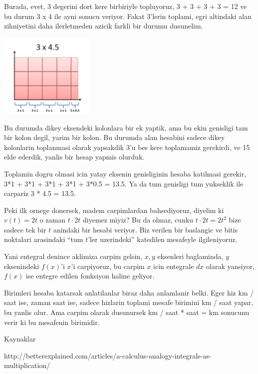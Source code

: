 \documentclass[12pt,fleqn]{article}\usepackage{../common}
\begin{document}
Burada, evet, 3 degerini dort kere birbiriyle topluyoruz, 3 + 3 + 3 + 3 =
12 ve bu durum 3 x 4 ile ayni sonucu veriyor. Fakat 3'lerin toplami, egri
altindaki alan zihniyetini daha ilerletmeden azicik farkli bir durumu
dusunelim. 

\includegraphics[height=4cm]{piecewise-multiplication.png}

Bu durumda dikey eksendeki kolonlara bir ek yaptik, ama bu ekin genisligi
tam bir kolon degil, yarim bir kolon. Bu durumda alan hesabini sadece dikey
kolonlarin toplanmasi olarak yapsakdik 3'u bes kere toplamamiz gerekirdi,
ve 15 elde ederdik, yanlis bir hesap yapmis olurduk.

Toplamin dogru olmasi icin yatay eksenin genisliginin hesaba katilmasi
gerekir, 3*1 + 3*1 + 3*1 + 3*1 + 3*0.5 = 13.5. Ya da tum genisligi tum
yukseklik ile carpariz 3 * 4.5 = 13.5. 

Peki ilk ornege donersek, madem carpimlardan bahsediyoruz, diyelim ki
$v(t)
= 2t$ o zaman $t
\cdot 2t$ diyemez miyiz? Bu da olmaz, cunku $t\cdot 2t = 2t^2$ 
bize sadece tek bir $t$ anindaki bir hesabi veriyor. Biz verilen bir 
baslangic ve bitis noktalari arasindaki ``tum $t$'ler uzerindeki'' 
katedilen mesafeyle ilgileniyoruz.  

Yani entegral denince aklimiza carpim gelsin, $x,y$ eksenleri baglaminda,
$y$ eksenindeki $f(x)$'i $x$'i carpiyoruz, bu carpim $x$ icin entegrale
$dx$ olarak yansiyor, $f(x)$ ise entegre edilen fonksiyon haline geliyor. 

Birimleri hesaba katarsak anlatilanlar biraz daha anlamlanir belki. Eger
hiz km / saat ise, zaman saat ise, sadece hizlarin toplami mesafe birimini
km / saat yapar, bu yanlis olur. Ama carpim olarak dusunursek km / saat *
saat = km sonucunu verir ki bu mesafenin birimidir. 

Kaynaklar

http://betterexplained.com/articles/a-calculus-analogy-integrals-as-multiplication/
\end{document}
